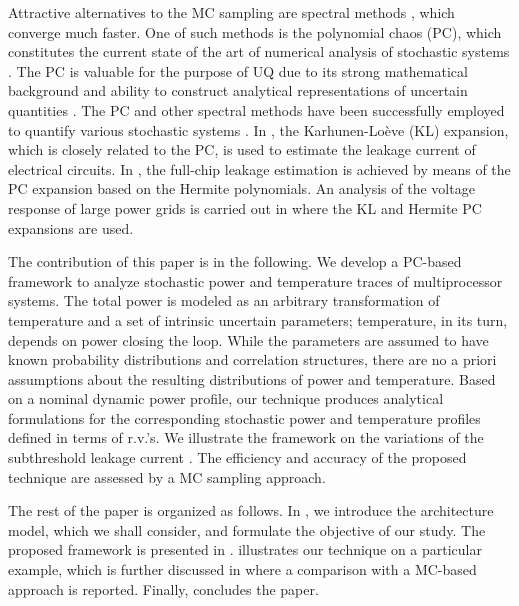 Attractive alternatives to the MC sampling are spectral methods \cite{maitre2010}, which converge much faster. One of such methods is the polynomial chaos (PC), which constitutes the current state of the art of numerical analysis of stochastic systems \cite{xiu2009}. The PC is valuable for the purpose of UQ due to its strong mathematical background and ability to construct analytical representations of uncertain quantities \cite{eldred2009}. The PC and other spectral methods have been successfully employed to quantify various stochastic systems \cite{xiu2010}. In \cite{bhardwaj2006}, the Karhunen-Lo\`{e}ve (KL) expansion, which is closely related to the PC, is used to estimate the leakage current of electrical circuits. In \cite{shen2009}, the full-chip leakage estimation is achieved by means of the PC expansion based on the Hermite polynomials. An analysis of the voltage response of large power grids is carried out in \cite{ghanta2006} where the KL and Hermite PC expansions are used.

The contribution of this paper is in the following. We develop a PC-based framework to analyze stochastic power and temperature traces of multiprocessor systems. The total power is modeled as an arbitrary transformation of temperature and a set of intrinsic uncertain parameters; temperature, in its turn, depends on power closing the loop. While the parameters are assumed to have known probability distributions and correlation structures, there are no a priori assumptions about the resulting distributions of power and temperature. Based on a nominal dynamic power profile, our technique produces analytical formulations for the corresponding stochastic power and temperature profiles defined in terms of r.v.'s. We illustrate the framework on the variations of the subthreshold leakage current \cite{srivastava2010}. The efficiency and accuracy of the proposed technique are assessed by a MC sampling approach.

The rest of the paper is organized as follows. In , we introduce the architecture model, which we shall consider, and formulate the objective of our study. The proposed framework is presented in .  illustrates our technique on a particular example, which is further discussed in  where a comparison with a MC-based approach is reported. Finally,  concludes the paper.
